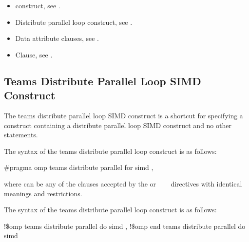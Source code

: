\crossreferences
\begin{itemize}
\item {} construct, see .

\item Distribute parallel loop construct, see 
      .

\item Data attribute clauses, see 
      .

\item {} Clause, see .

\end{itemize}










\subsection{Teams Distribute Parallel Loop SIMD Construct}
\label{subsec:Teams Distribute Parallel Loop SIMD Construct}
\summary
The teams distribute parallel loop SIMD construct is a shortcut for specifying a  
construct containing a distribute parallel loop SIMD construct and no other statements.

\syntax
\ccppspecificstart
The syntax of the teams distribute parallel loop construct is as follows:

\begin{boxedcode}
\#pragma omp teams distribute parallel for simd \plc{[clause[ [},\plc{] clause] ... ]}
\end{boxedcode}

where  can be any of the clauses accepted by the  or 
~~~
directives with identical meanings and restrictions.
\ccppspecificend

\fortranspecificstart
The syntax of the teams distribute parallel loop construct is as follows:

\begin{boxedcode}
!\$omp teams distribute parallel do simd \plc{[clause[ [},\plc{] clause] ... ]}
\plc{[}!\$omp end teams distribute parallel do simd\plc{]}
\end{boxedcode}

